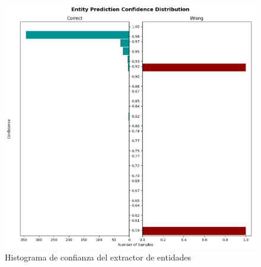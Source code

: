 \begin{figure}[h!]
    \centering
    \includegraphics[width=\textwidth]{imagenes/cap5/DIETClassifier_histogram.png}
    \caption{Histograma de confianza del extractor de entidades}
    \label{fig:entity_histograma}
\end{figure}

